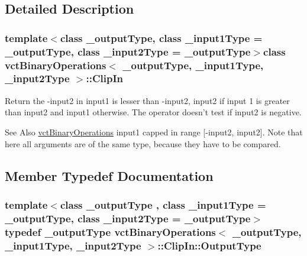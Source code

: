 \subsection{Detailed Description}
\subsubsection*{template$<$class \-\_\-output\-Type, class \-\_\-input1\-Type = \-\_\-output\-Type, class \-\_\-input2\-Type = \-\_\-output\-Type$>$class vct\-Binary\-Operations$<$ \-\_\-output\-Type, \-\_\-input1\-Type, \-\_\-input2\-Type $>$\-::\-Clip\-In}

Return the -\/input2 in input1 is lesser than -\/input2, input2 if input 1 is greater than input2 and input1 otherwise. The operator doesn't test if input2 is negative. 

\begin{DoxySeeAlso}{See Also}
\hyperlink{classvct_binary_operations}{vct\-Binary\-Operations} input1 capped in range \mbox{[}-\/input2, input2\mbox{]}. Note that here all arguments are of the same type, because they have to be compared. 
\end{DoxySeeAlso}


\subsection{Member Typedef Documentation}
\hypertarget{classvct_binary_operations_1_1_clip_in_ad09cdc8a73a37ea74b60e83b670db658}{
\subsubsection[{Output\-Type}]{\setlength{\rightskip}{0pt plus 5cm}template$<$class \-\_\-output\-Type , class \-\_\-input1\-Type  = \-\_\-output\-Type, class \-\_\-input2\-Type  = \-\_\-output\-Type$>$ typedef \-\_\-output\-Type {\bf vct\-Binary\-Operations}$<$ \-\_\-output\-Type, \-\_\-input1\-Type, \-\_\-input2\-Type $>$\-::{\bf Clip\-In\-::\-Output\-Type}}}\label{classvct_binary_operations_1_1_clip_in_ad09cdc8a73a37ea74b60e83b670db658}


